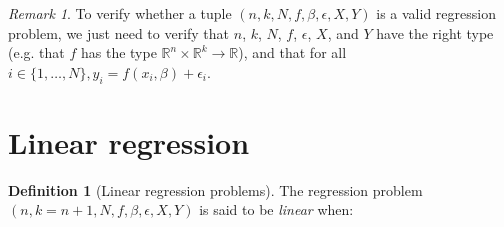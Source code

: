 \documentclass{article}
\theoremstyle{definition}
\newtheorem{definition}{Definition}[section]
\theoremstyle{remark}
\newtheorem*{remark}{Remark}
\theoremstyle{example}
\begin{document}
\begin{remark}
		To verify whether a tuple $(n, k, N, f, \beta, \epsilon, X, Y)$ is a valid regression problem, we just need to verify that $n$, $k$, $N$, $f$, $\epsilon$, $X$, and $Y$ have the right type (e.g. that $f$ has the type $\mathbb{R}^n \times \mathbb{R}^k \rightarrow \mathbb{R}$), and that for all $i \in \{1, \dots, N\}, y_i = f(x_i, \beta) + \epsilon_i$.
\end{remark}

\section{Linear regression}

\begin{definition}[Linear regression problems]
		The regression problem $(n, k=n+1, N, f, \beta, \epsilon, X, Y)$ is said to be \textit{linear} when:


\end{definition}
\end{document}
